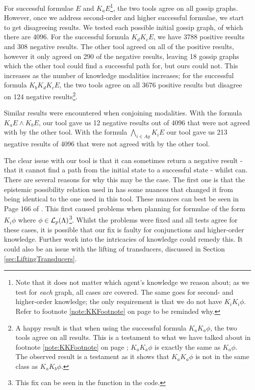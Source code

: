 \documentclass[ %
                    author={Leo Poulson},
                supervisor={Dr. Steven Ramsay},
                    degree={BSc},
                     title={Epistemic Planning for the Dynamic Gossip problem},
                  subtitle={},
                      year={2019} ]{dissertation}
\begin{document}
For successful formulae $E$ and $K_a E$\footnote{Note that it does not matter
  which agent's knowledge we reason about; as we test for \emph{each} graph, all
  cases are covered. The same goes for second- and higher-order knowledge; the
  only requirement is that we do not have $K_i K_i \phi$. Refer to footnote
  \ref{note:KKFootnote} on page \pageref{note:KKFootnote} to be reminded why.},
the two tools agree on all gossip graphs. However, once we address second-order
and higher successful formulae, we start to get disagreeing results. We tested
each possible initial gossip graph, of which there are 4096. For the successful
formula $K_d K_c E$, we have 3788 positive results and 308 negative results. The
other tool agreed on all of the positive results, however it only agreed on 290 of
the negative results, leaving 18 gossip graphs which the other tool could find a
successful path for, but ours could not. This increases as the number of
knowledge modalities increases; for the successful formula $K_b K_d K_c E$, the
two tools agree on all 3676 positive results but disagree on 124 negative
results\footnote{A happy result is that when using the successful formula $K_a
  K_a \phi$, the two tools agree on all results. This is a testament to what we
  have talked about in footnote \ref{note:KKFootnote} on page
  \pageref{note:KKFootnote}; $K_a K_a \phi$ is exactly the same as $K_a \phi$.
  The observed result is a testament as it shows that $K_a K_a \phi$ is not in
  the same class as $K_a K_b \phi$.}.

Similar results were encountered when conjoining modalities. With the formula
$K_a E \land K_b E$, our tool gave us 12 negative results out of 4096 that were
not agreed with by the other tool. With the formula $\bigwedge_{i \in Ag} K_i E$
our tool gave us 213 negative results of 4096 that were not agreed with by the
other tool.

The clear issue with our tool is that it can sometimes return a negative result
- that it cannot find a path from the initial state to a successful state -
whilst \cite{GithubGossip} can. There are several reasons for why this may be
the case. The first one is that the epistemic possibility relation used in
\cite{GithubGossip} has some nuances that changed it from being identical to the
one used in this tool. These nuances can best be seen in Page 166 of
\cite{SMCDEL}. This first caused problems when planning for formulae of the form
$K_i \phi$ where $\phi \in \mathcal{L}_p(\Lambda)$\footnote{This fix can be seen in
  the  function in the code.}. Whilst the problems were fixed
and all tests agree for these cases, it is possible that our fix is faulty for
conjunctions and higher-order knowledge. Further work into the intricacies of
knowledge could remedy this. It could also be an issue with the lifting of
transducers, discussed in Section \ref{sec:LiftingTransducers}.
\end{document}
